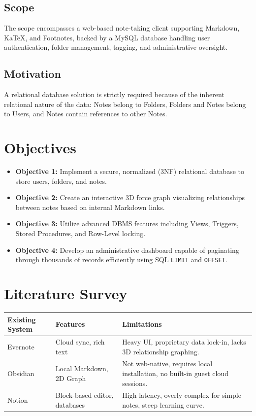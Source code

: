 \documentclass[12pt,a4paper]{report}
\begin{document}
\section{Scope}
The scope encompasses a web-based note-taking client supporting Markdown, KaTeX, and Footnotes, backed by a MySQL database handling user authentication, folder management, tagging, and administrative oversight.

\section{Motivation}
A relational database solution is strictly required because of the inherent relational nature of the data: Notes belong to Folders, Folders and Notes belong to Users, and Notes contain references to other Notes.

\chapter{Objectives}
\begin{itemize}
    \item \textbf{Objective 1:} Implement a secure, normalized (3NF) relational database to store users, folders, and notes.
    \item \textbf{Objective 2:} Create an interactive 3D force graph visualizing relationships between notes based on internal Markdown links.
    \item \textbf{Objective 3:} Utilize advanced DBMS features including Views, Triggers, Stored Procedures, and Row-Level locking.
    \item \textbf{Objective 4:} Develop an administrative dashboard capable of paginating through thousands of records efficiently using SQL \texttt{LIMIT} and \texttt{OFFSET}.
\end{itemize}

\chapter{Literature Survey}
\begin{table}[h]
    \centering
    \begin{tabular}{|p{3cm}|p{5cm}|p{6cm}|}
    \hline
    \textbf{Existing System} & \textbf{Features} & \textbf{Limitations} \\ \hline
    Evernote & Cloud sync, rich text & Heavy UI, proprietary data lock-in, lacks 3D relationship graphing. \\ \hline
    Obsidian & Local Markdown, 2D Graph & Not web-native, requires local installation, no built-in guest cloud sessions. \\ \hline
    Notion & Block-based editor, databases & High latency, overly complex for simple notes, steep learning curve. \\ \hline
    \end{tabular}
\end{table}
\end{document}
